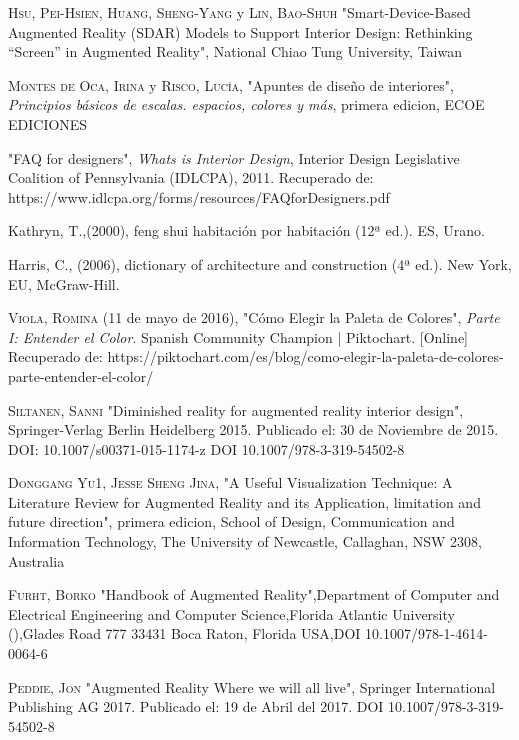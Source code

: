 \begin{thebibliography}{X}
	
	 \textsc{Hsu, Pei-Hsien}, \textsc{Huang, Sheng-Yang} y \textsc{Lin, Bao-Shuh} "Smart-Device-Based Augmented Reality (SDAR) Models to Support Interior Design: Rethinking “Screen” in Augmented Reality", National Chiao Tung University, Taiwan
	
	 \textsc{Montes de Oca, Irina} y \textsc{Risco, Lucía},
	"Apuntes de diseño de interiores",
	\textit{Principios básicos de escalas. espacios, colores y más}, primera edicion,
	ECOE EDICIONES
	
	 "FAQ for designers", \textit{Whats is Interior Design}, Interior Design Legislative Coalition of Pennsylvania (IDLCPA), 2011. Recuperado de: https://www.idlcpa.org/forms/resources/FAQforDesigners.pdf
	
	 Kathryn, T.,(2000), feng shui habitación por habitación (12ª ed.). ES, Urano.	
	
	 Harris, C., (2006), dictionary of architecture and construction (4ª ed.). New York, EU, McGraw-Hill.
	
		
	 \textsc{Viola, Romina} (11 de mayo de 2016), "Cómo Elegir la Paleta de Colores", \textit{Parte I: Entender el Color}. Spanish Community Champion | Piktochart. [Online] Recuperado de: https://piktochart.com/es/blog/como-elegir-la-paleta-de-colores-parte-entender-el-color/
	
	
	
	 \textsc{Siltanen, Sanni} "Diminished reality for augmented reality interior design", Springer-Verlag Berlin Heidelberg 2015. Publicado el: 30 de Noviembre de 2015. DOI: 10.1007/s00371-015-1174-z
	DOI 10.1007/978-3-319-54502-8
	
	 \textsc{Donggang Yu1, Jesse Sheng Jina},
	"A Useful Visualization Technique: A Literature Review for Augmented Reality and its Application, limitation and future direction", primera edicion,
	School of Design, Communication and Information Technology, The University of Newcastle, Callaghan, NSW 2308, Australia
	
	
	
	 \textsc{Furht, Borko} "Handbook of Augmented Reality",Department of Computer and Electrical Engineering and Computer Science,Florida Atlantic University (),Glades Road 777 33431 Boca Raton, Florida USA,DOI 10.1007/978-1-4614-0064-6
	
	 \textsc{Peddie, Jon} "Augmented Reality Where we will all live", Springer International Publishing AG 2017. Publicado el: 19 de Abril del 2017. DOI 10.1007/978-3-319-54502-8 
	

\end{thebibliography}
